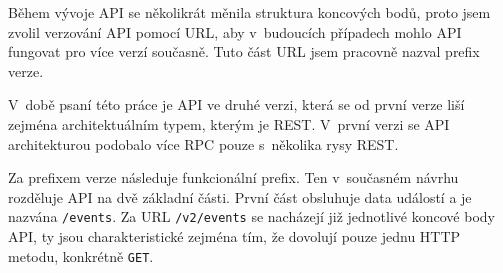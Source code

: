 Během vývoje API se několikrát měnila struktura koncových bodů, proto jsem zvolil verzování API pomocí URL, aby v~budoucích případech mohlo API fungovat pro více verzí současně. Tuto část URL jsem pracovně nazval prefix verze.

V~době psaní této práce je API ve druhé verzi, která se od první verze liší zejména architektuálním typem, kterým je REST. V~první verzi se API architekturou podobalo více RPC pouze s~několika rysy REST.

Za prefixem verze následuje funkcionální prefix. Ten v~současném návrhu rozděluje API na dvě základní části. První část obsluhuje data událostí a je nazvána \texttt{/events}. Za URL \texttt{/v2/events} se nacházejí již jednotlivé koncové body API, ty jsou charakteristické zejména tím, že dovolují pouze jednu HTTP metodu, konkrétně \texttt{GET}.

